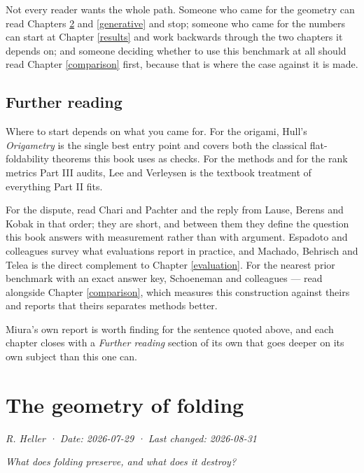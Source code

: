 \documentclass[
  british,
  a4paper,
]{book}
\begin{document}
Not every reader wants the whole path. Someone who came for the geometry can
read Chapters \ref{folding-geometry} and \ref{generative} and stop; someone
who came for the numbers can start at Chapter \ref{results} and work backwards
through the two chapters it depends on; and someone deciding whether to use this
benchmark at all should read Chapter \ref{comparison} first, because that is
where the case against it is made.

\section{Further reading}\label{intro-reading}

Where to start depends on what you came for. For the origami, Hull's
\emph{Origametry} \citep{hull2020origametry} is the single best entry point and covers
both the classical flat-foldability theorems this book uses as checks. For the
methods and for the rank metrics Part III audits, Lee and Verleysen
\citep{lee2007nonlinear} is the textbook treatment of everything Part II fits.

For the dispute, read Chari and Pachter \citep{chari2023specious} and the reply from
Lause, Berens and Kobak \citep{lause2024elephant} in that order; they are short, and
between them they define the question this book answers with measurement rather
than with argument. Espadoto and colleagues \citep{espadoto2021survey} survey what
evaluations report in practice, and Machado, Behrisch and Telea
\citep{machado2025necessary} is the direct complement to Chapter \ref{evaluation}.
For the nearest prior benchmark with an exact answer key, Schoeneman and
colleagues \citep{schoeneman2017error} --- read alongside Chapter \ref{comparison},
which measures this construction against theirs and reports that theirs
separates methods better.

Miura's own report \citep{miura1985method} is worth finding for the sentence quoted
above, and each chapter closes with a \emph{Further reading} section of its own that
goes deeper on its own subject than this one can.

\chapter{The geometry of folding}\label{folding-geometry}

\emph{R. Heller · Date: 2026-07-29 · Last changed: 2026-08-31}

\emph{What does folding preserve, and what does it destroy?}
\end{document}
